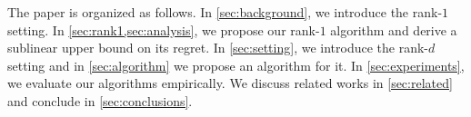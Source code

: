 The paper is organized as follows. In \cref{sec:background}, we introduce the rank-$1$ setting. In \cref{sec:rank1,sec:analysis}, we propose our rank-$1$ algorithm and derive a sublinear upper bound on its regret. In \cref{sec:setting}, we introduce the rank-$d$ setting and in \cref{sec:algorithm} we propose an algorithm for it. In \cref{sec:experiments}, we evaluate our algorithms empirically. We discuss related works in \cref{sec:related} and conclude in \cref{sec:conclusions}. 